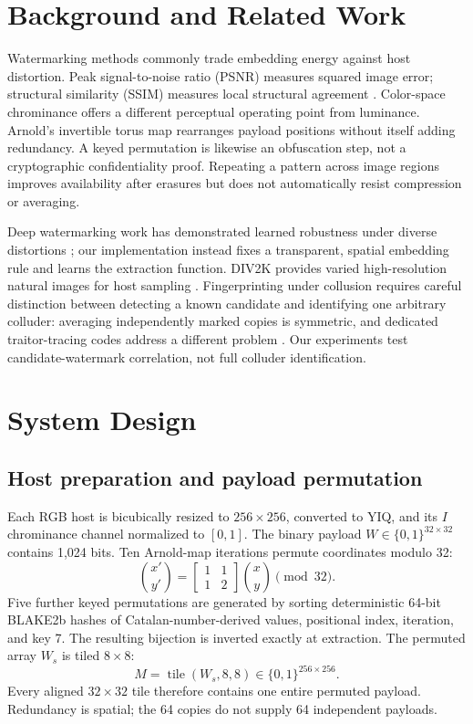 \documentclass[conference]{IEEEtran}
\begin{document}
\section{Background and Related Work}
Watermarking methods commonly trade embedding energy against host distortion. Peak signal-to-noise ratio (PSNR) measures squared image error; structural similarity (SSIM) measures local structural agreement \cite{wang2004ssim}. Color-space chrominance offers a different perceptual operating point from luminance. Arnold's invertible torus map rearranges payload positions without itself adding redundancy. A keyed permutation is likewise an obfuscation step, not a cryptographic confidentiality proof. Repeating a pattern across image regions improves availability after erasures but does not automatically resist compression or averaging.

Deep watermarking work has demonstrated learned robustness under diverse distortions \cite{zhu2018hidden,ahmadi2020redmark}; our implementation instead fixes a transparent, spatial embedding rule and learns the extraction function. DIV2K provides varied high-resolution natural images for host sampling \cite{agustsson2017ntire}. Fingerprinting under collusion requires careful distinction between detecting a known candidate and identifying one arbitrary colluder: averaging independently marked copies is symmetric, and dedicated traitor-tracing codes address a different problem \cite{boneh1998collusion,tardos2008optimal}. Our experiments test candidate-watermark correlation, not full colluder identification.

\section{System Design}
\subsection{Host preparation and payload permutation}
Each RGB host is bicubically resized to $256\times256$, converted to YIQ, and its $I$ chrominance channel normalized to $[0,1]$. The binary payload $W\in\{0,1\}^{32\times32}$ contains 1,024 bits. Ten Arnold-map iterations permute coordinates modulo 32:
\begin{equation}
\binom{x'}{y'}=\begin{bmatrix}1&1\\1&2\end{bmatrix}\binom{x}{y}\pmod{32}.
\end{equation}
Five further keyed permutations are generated by sorting deterministic 64-bit BLAKE2b hashes of Catalan-number-derived values, positional index, iteration, and key 7. The resulting bijection is inverted exactly at extraction. The permuted array $W_s$ is tiled $8\times8$:
\begin{equation} M=\operatorname{tile}(W_s,8,8)\in\{0,1\}^{256\times256}.\end{equation}
Every aligned $32\times32$ tile therefore contains one entire permuted payload. Redundancy is spatial; the 64 copies do not supply 64 independent payloads.
\end{document}

